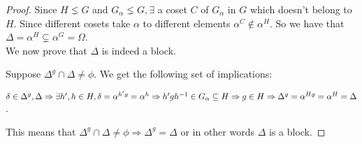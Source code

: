 \begin{proof}
Since $H \lneq G$ and $G_\alpha \lneq G, \exists$ a coset $C$ of $G_\alpha$ in $G$ which doesn't belong to $H$. Since different cosets take $\alpha$ to different elements $\alpha^C \notin \alpha^H$. So we have that $\Delta = \alpha^H \subsetneq \alpha^G = \Omega$. \\

We now prove that $\Delta$ is indeed a block. 

Suppose $\Delta^g \cap \Delta \neq \phi$. We get the following set of implications:

$\delta \in \Delta^g,\Delta \\
\Rightarrow \exists h',h \in H, \delta = \alpha^{h'g} = \alpha^h \\
\Rightarrow h'gh^{-1} \in G_\alpha \subseteq H \\
\Rightarrow g \in H \\
\Rightarrow \Delta^g = \alpha^{Hg} = \alpha^H = \Delta$. 

This means that $\Delta^g \cap \Delta \neq \phi \Rightarrow \Delta^g = \Delta$ or in other words $\Delta$ is a block.

\end{proof}





